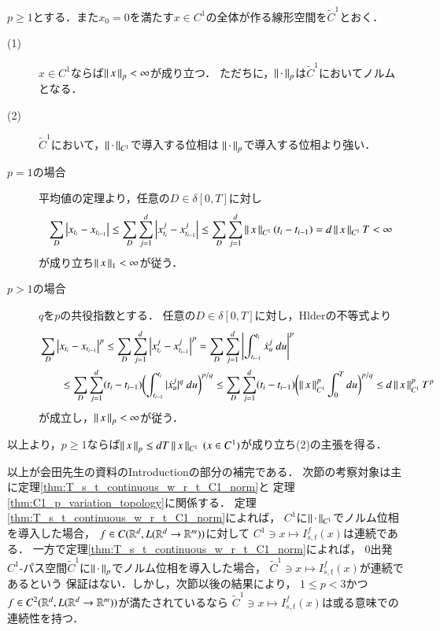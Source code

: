 \begin{screen}
	\begin{thm}\label{thm:C1_p_variation_topology}
		$p \geq 1$とする．また$x_0 = 0$を満たす$x \in C^1$の全体が作る線形空間を$\tilde{C}^1$とおく．
		\begin{description}
			\item[(1)] $x \in C^1$ならば$\left\|\, x\, \right\|_{p} < \infty$が成り立つ．
				ただちに，$\left\|\, \cdot\, \right\|_{p}$は$\tilde{C}^1$においてノルムとなる．
			\item[(2)] $\tilde{C}^1$において，$\left\|\, \cdot\, \right\|_{C^1}$で導入する位相は
				$\left\|\, \cdot\, \right\|_{p}$で導入する位相より強い．
		\end{description}
	\end{thm}
\end{screen}

\begin{prf}\mbox{}
	\begin{description}
		\item[$p = 1$の場合]
			平均値の定理より，任意の$D \in \delta[0,T]$に対し
			\begin{align}
				\sum_D \left| x_{t_i} - x_{t_{i-1}} \right|
				\leq \sum_D \sum_{j=1}^d \left| x^j_{t_i} - x^j_{t_{i-1}} \right|
				\leq \sum_D \sum_{j=1}^d \left\|\, x\, \right\|_{C^1}(t_i - t_{i-1})
				= d\left\|\, x\, \right\|_{C^1}T < \infty
			\end{align}
			が成り立ち$\left\|\, x\, \right\|_{1} < \infty$が従う．
		
		\item[$p > 1$の場合] $q$を$p$の共役指数とする．
			任意の$D \in \delta[0,T]$に対し，Hlderの不等式より
			\begin{align}
				&\sum_D \left| x_{t_i} - x_{t_{i-1}} \right|^p
				\leq \sum_D \sum_{j=1}^d \left| x^j_{t_i} - x^j_{t_{i-1}} \right|^p
				= \sum_D \sum_{j=1}^d \left| \int_{t_{i-1}}^{t_i} \dot{x}^j_{u}\ du \right|^p \\
				&\qquad \leq \sum_D \sum_{j=1}^d (t_i - t_{i-1})
					\biggl( \int_{t_{i-1}}^{t_i} | \dot{x}^j_{u} |^q\ du \biggr)^{p/q}
				\leq \sum_D \sum_{j=1}^d (t_i - t_{i-1})
					\biggl( \left\|\, x\, \right\|_{C^1}^p \int_{0}^{T} du \biggr)^{p/q}
				\leq d\left\|\, x\, \right\|_{C^1}^p T^p
			\end{align}
			が成立し，$\left\|\, x\, \right\|_{p} < \infty$が従う．
	\end{description}
	以上より，$p \geq 1$ならば$\left\|\, x\, \right\|_{p} \leq dT\left\|\, x\, \right\|_{C^1}\ (x \in C^1)$が成り立ち(2)の主張を得る．
	\QED
\end{prf}

	以上が会田先生の資料のIntroductionの部分の補完である．
	次節の考察対象は主に定理\ref{thm:T_s_t_continuous_w_r_t_C1_norm}と
	定理\ref{thm:C1_p_variation_topology}に関係する．
	定理\ref{thm:T_s_t_continuous_w_r_t_C1_norm}によれば，
	$C^1$に$\left\|\, \cdot\, \right\|_{C^1}$でノルム位相を導入した場合，
	$f \in C(\mathbb{R}^d,L(\mathbb{R}^d \rightarrow \mathbb{R}^m))$に対して
	$C^1 \ni x \longmapsto I^f_{s,t}(x)$は連続である．
	一方で定理\ref{thm:T_s_t_continuous_w_r_t_C1_norm}によれば，
	0出発$C^1$-パス空間$\tilde{C}^1$に$\left\|\, \cdot\, \right\|_{p}$でノルム位相を導入した場合，
	$\tilde{C}^1 \ni x \longmapsto I^f_{s,t}(x)$が連続であるという
	保証はない．しかし，次節以後の結果により，
	$1 \leq p < 3$かつ$f \in C^2(\mathbb{R}^d,L(\mathbb{R}^d \rightarrow \mathbb{R}^m))$が満たされているなら
	$\tilde{C}^1 \ni x \longmapsto I^f_{s,t}(x)$は或る意味での連続性を持つ．
